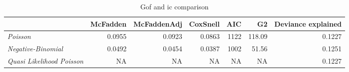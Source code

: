 \begin{wraptable}{r}{3in}

\caption{\label{tab:gof_ic_comparison}Gof and ic comparison}
\centering
\fontsize{9}{11}\selectfont
\begin{tabular}[t]{>{}lrrrrrr}
\toprule
  & McFadden & McFaddenAdj & CoxSnell & AIC & G2 & Deviance explained\\
\midrule
\em{Poisson} & 0.0955 & 0.0923 & 0.0863 & 1122 & 118.09 & 0.1227\\
\em{Negative-Binomial} & 0.0492 & 0.0454 & 0.0387 & 1002 & 51.56 & 0.1251\\
\em{Quasi Likelihood Poisson} & NA & NA & NA & NA & NA & 0.1227\\
\bottomrule
\end{tabular}
\end{wraptable}

